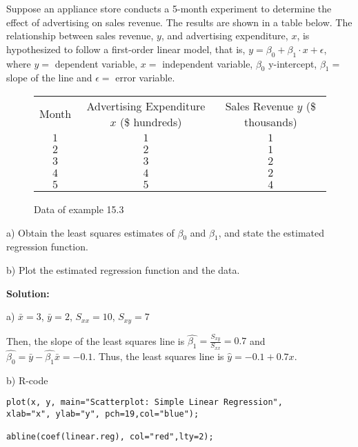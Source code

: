 \begin{example}
Suppose an appliance store conducts a 5-month experiment to determine the effect of advertising on sales revenue. The results are shown in a table below. The relationship between sales revenue, $y$, and advertising expenditure, $x$, is hypothesized to follow a ﬁrst-order linear model, that is, $y = \beta_0 + \beta_1\cdot x + \epsilon$, where $y =$ dependent variable, $x =$ independent variable, $\beta_0$ y-intercept, $\beta_1 =$ slope of the line and $\epsilon =$ error variable.

\begin{center}
\begin{figure}[H]
\centering
\begin{tabular}{ c c c }
Month & Advertising Expenditure $x$ (\$ hundreds) & Sales Revenue $y$ (\$ thousands)\\
$1$ & $1$ & $1$\\
$2$ & $2$ & $1$\\
$3$ & $3$ & $2$\\
$4$ & $4$ & $2$\\
$5$ & $5$ & $4$\\
\end{tabular}
\caption{Data of example 15.3}
\end{figure}
\end{center}
\vspace{-0.75cm}

a) Obtain the least squares estimates of $\beta_0$ and $\beta_1$, and state the estimated regression function.

b) Plot the estimated regression function and the data.

\textbf{Solution: }

a) $\bar{x} = 3$, $\bar{y} = 2$, $S_{xx} = 10$, $S_{xy} = 7$

Then, the slope of the least squares line is $\hat{\beta_1} = \frac{S_{xy}}{S_{xx}} = 0.7$ and $\hat{\beta_0} = \bar{y} - \hat{\beta_1}\bar{x} = -0.1$. Thus, the least squares line is $\hat{y} = -0.1 + 0.7x$.

b) R-code

\begin{tcolorbox}[colback=gray!10, colframe=gray!50, arc=2mm]
\begin{verbatim}
plot(x, y, main="Scatterplot: Simple Linear Regression",
xlab="x", ylab="y", pch=19,col="blue");

abline(coef(linear.reg), col="red",lty=2);
\end{verbatim}
\end{tcolorbox}
\end{example}

